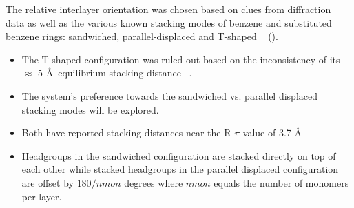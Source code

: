 \documentclass{article}
\newcommand{\angstrom}{\textup{\AA}}
\begin{document}
  The relative interlayer orientation was chosen based on clues from 
  diffraction data as well as the various known stacking modes of benzene 
  and substituted benzene rings: sandwiched, parallel-displaced and T-shaped
  ~\cite{sinnokrot_estimates_2002} ().
  \begin{itemize}
    \item The T-shaped configuration was ruled out based on the inconsistency of
    its $\approx$ 5 \angstrom~equilibrium stacking distance ~\cite{sinnokrot_estimates_2002}.
    \item The system's preference towards the sandwiched vs. parallel displaced 
    stacking modes will be explored.
    \item Both have reported stacking distances near the R-$\pi$ value of 3.7 \angstrom %
    \item Headgroups in the sandwiched configuration are stacked directly on top of
    each other while stacked headgroups in the parallel displaced configuration are offset 
    by $180/nmon$ degrees where $nmon$ equals the number of monomers per layer.
  \end{itemize}
\end{document}
